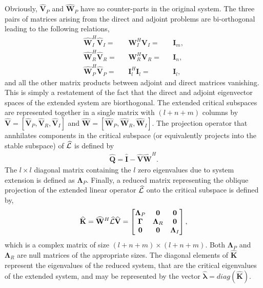 Obviously, $\mathbf{\widehat{V}}_{P}$ and $\mathbf{\widehat{W}}_{P}$ have no counter-parts in the original system. The three pairs of matrices arising from the direct and adjoint problems are bi-orthogonal leading to the following relations,
\begin{subequations}
	\begin{align}
		\mathbf{\widehat{W}}^{H}_{I}\mathbf{\widehat{V}}_{I} =&& \mathbf{W}^{H}_{I}\mathbf{V}_{I} =&& \mathbf{I}_{m}, \\
		\mathbf{\widehat{W}}^{H}_{R}\mathbf{\widehat{V}}_{R} =&& \mathbf{W}^{H}_{R}\mathbf{V}_{R} =&& \mathbf{I}_{n}, \\
		\mathbf{\widehat{W}}^{H}_{P}\mathbf{\widehat{V}}_{P} =&& \mathbf{I}^{H}_{l}\mathbf{I}_{l} =&& \mathbf{I}_{l}, 
	\end{align}
\end{subequations}
and all the other matrix products between adjoint and direct matrices vanishing. This is simply a restatement of the fact that the direct and adjoint eigenvector spaces of the extended system are biorthogonal. The extended critical subspaces are represented together in a single matrix with $(l+n+m)$ columns by $\mathbf{\widehat{V}} = [\mathbf{\widehat{V}}_{P}, \mathbf{\widehat{V}}_{R}, \mathbf{\widehat{V}}_{I}]$ and $\mathbf{\widehat{W}} = [\mathbf{\widehat{W}}_{P}, \mathbf{\widehat{W}}_{R}, \mathbf{\widehat{W}}_{I}]$. The projection operator that annhilates components in the critical subspace (or equivalently projects into the stable subspace) of $\mathcal{\widehat{L}}$ is defined by
\begin{eqnarray}
	\label{eqn:stable_projector_extended}
	\mathbf{\widehat{Q}} = \mathbf{\widehat{I}} - \mathbf{\widehat{V}}\mathbf{\widehat{W}}^{H}.
\end{eqnarray}
The $l\times l$ diagonal matrix containing the $l$ zero eigenvalues due to system extension is defined as $\mathbf{\Lambda}_{P}$. 
Finally, a reduced matrix representing the oblique projection of the extended linear operator $\mathcal{\widehat{L}}$ onto the critical subspace is defined by,
\begin{eqnarray}
	\label{eqn:khat}
	\mathbf{\widehat{K}} = \mathbf{\widehat{W}}^{H}\mathcal{\widehat{L}}\mathbf{\widehat{V}} = 
	\begin{bmatrix}
		\mathbf{\Lambda}_{P} & \mathbf{0} & \mathbf{0} \\ 
 		\mathbf{\Gamma} &  \mathbf{\Lambda}_{R} & \mathbf{0} \\ 
		\mathbf{0} & \mathbf{0} & \mathbf{\Lambda}_{I} 
	\end{bmatrix},
\end{eqnarray}
which is a complex matrix of size $(l+n+m)\times(l+n+m)$. Both $\mathbf{\Lambda}_{P}$ and $\mathbf{\Lambda}_{R}$ are null matrices of the appropriate sizes. The diagonal elements of $\mathbf{\widehat{K}}$ represent the eigenvalues of the reduced system, that are the critical eigenvalues of the extended system, and may be represented by the vector $\widehat{\boldsymbol{\lambda}} = diag(\mathbf{\widehat{K}})$. 

